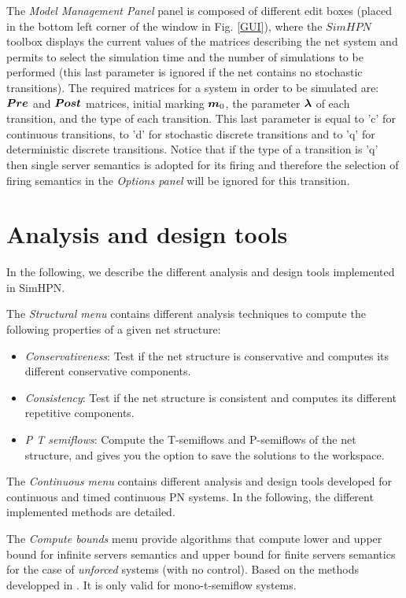 The \emph{Model Management Panel} panel is composed of different edit boxes (placed in the bottom left corner of the window in Fig. \ref{GUI}), where the $SimHPN$ toolbox displays the current values of the matrices describing the net system and permits to select the simulation time and the number of simulations to be performed (this last parameter is ignored if the net contains no stochastic transitions).  The required matrices for a system in order to be simulated are: $\b{Pre}$ and $\b{Post}$ matrices, initial marking $\mo$, the parameter $\b{\lambda}$ of each transition, and the type of each transition. This last parameter is equal to 'c' for continuous transitions, to 'd' for stochastic discrete transitions and to 'q' for deterministic discrete transitions. Notice that if the type of a transition is 'q' then single server semantics is adopted for its firing and therefore the selection of firing semantics in the \emph{Options panel} will be ignored for this transition.

\section{Analysis and design tools}

In the following, we describe the different analysis and design tools implemented in SimHPN. 

The {\color{blue}\emph{Structural menu}} contains different analysis techniques to compute the following properties of a given net structure:

\begin{itemize}
\item \emph{Conservativeness}: Test if the net structure is conservative and computes its different conservative components.
\item \emph{Consistency}: Test if the net structure is consistent and computes its different repetitive components.
\item \emph{P T semiflows}: Compute the T-semiflows and P-semiflows of the net structure, and gives you the option to save the solutions to the workspace.
\end{itemize} 


The {\color{blue}\emph{Continuous menu}} contains different analysis and design tools developed for continuous and timed continuous PN systems. In the following, the different implemented methods are detailed. 

The \emph{Compute bounds} menu provide algorithms that compute lower and upper bound for infinite servers semantics and upper bound for finite servers semantics for the case of \emph{unforced} systems (with no control). Based on the methods developped in \cite{julvez2005steady}. It is only valid for mono-t-semiflow systems. 

